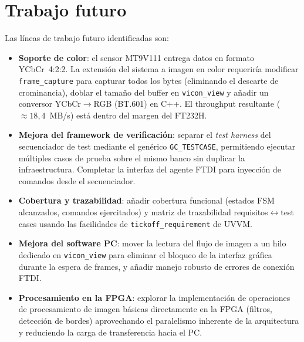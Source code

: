 \documentclass[../main.tex]{subfiles}
\begin{document}
\section{Trabajo futuro}

Las líneas de trabajo futuro identificadas son:

\begin{itemize}
    \item \textbf{Soporte de color}: el sensor MT9V111 entrega datos en formato YCbCr~4:2:2. La extensión del sistema a imagen en color requeriría modificar \texttt{frame\_capture} para capturar todos los bytes (eliminando el descarte de crominancia), doblar el tamaño del buffer en \texttt{vicon\_view} y añadir un conversor YCbCr$\rightarrow$RGB (BT.601) en C++. El throughput resultante ($\approx 18{,}4$~MB/s) está dentro del margen del FT232H.

    \item \textbf{Mejora del framework de verificación}: separar el \textit{test harness} del secuenciador de test mediante el genérico \texttt{GC\_TESTCASE}, permitiendo ejecutar múltiples casos de prueba sobre el mismo banco sin duplicar la infraestructura. Completar la interfaz del agente FTDI para inyección de comandos desde el secuenciador.

    \item \textbf{Cobertura y trazabilidad}: añadir cobertura funcional (estados FSM alcanzados, comandos ejercitados) y matriz de trazabilidad requisitos$\leftrightarrow$test cases usando las facilidades de \texttt{tickoff\_requirement} de UVVM.

    \item \textbf{Mejora del software PC}: mover la lectura del flujo de imagen a un hilo dedicado en \texttt{vicon\_view} para eliminar el bloqueo de la interfaz gráfica durante la espera de frames, y añadir manejo robusto de errores de conexión FTDI.

    \item \textbf{Procesamiento en la FPGA}: explorar la implementación de operaciones de procesamiento de imagen básicas directamente en la FPGA (filtros, detección de bordes) aprovechando el paralelismo inherente de la arquitectura y reduciendo la carga de transferencia hacia el PC.
\end{itemize}
\end{document}
